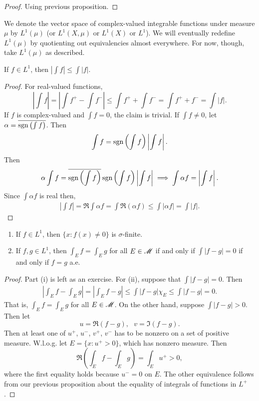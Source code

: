 \documentclass[12pt]{article} %
\begin{document}
\begin{proof}
    Using previous proposition.
\end{proof}

We denote the vector space of complex-valued integrable functions under measure $\mu$ by $L^1(\mu)$ (or $L^1(X, \mu)$ or $L^1(X)$ or $L^1$). We will eventually redefine $L^1(\mu)$ by quotienting out equivalencies almost everywhere. For now, though, take $L^1(\mu)$ as described.

\begin{proposition}
    If $f \in L^1$, then $\left| \int f \right| \leq \int |f|$.
\end{proposition}

\begin{proof}
    For real-valued functions, \[\left|\int f\right| = \left| \int f^+ - \int f^-\right| \leq \int f^+ + \int f^- = \int f^+ + f^- = \int |f|.\] If $f$ is complex-valued and $\int f = 0$, the claim is trivial. If $\int f \neq 0$, let $\alpha = \overline{\operatorname{sgn} \left(\int f\right)}$. Then \[\int f = \operatorname{sgn} \left(\int f \right) \left|\int f\right|.\] Then \[\alpha \int f = \overline{\operatorname{sgn} \left(\int f\right)} \operatorname{sgn} \left(\int f \right) \left|\int f\right| \implies \int \alpha f = \left|\int f\right|.\] Since $\int \alpha f$ is real then, \begin{align*}
        \left|\int f\right| = \Re \int \alpha f = \int \Re(\alpha f) \leq \int |\alpha f| = \int |f|.
    \end{align*}
\end{proof}

\begin{proposition}\label{prop:integrable-functions-equal-ae}
    \begin{enumerate}
        \item If $f \in L^1$, then $\{x : f(x) \neq 0\}$ is $\sigma$-finite.
        \item If $f, g \in L^1$, then $\int_E f = \int_E g$ for all $E \in \mathscr{M}$ if and only if $\int |f - g| = 0$ if and only if $f = g$ a.e.
    \end{enumerate}
\end{proposition}

\begin{proof}
    Part (i) is left as an exercise. For (ii), suppose that $\int |f - g| = 0$. Then \begin{align*}
        \left| \int_E f - \int_E g \right| = \left|\int_E f-g\right| \leq \int |f-g| \chi_E \leq \int |f-g| = 0.
    \end{align*} That is, $\int_E f = \int_E g$ for all $E \in \mathscr{M}$. On the other hand, suppose $\int |f - g| > 0$. Then let \[u = \Re(f-g), \ \ \ v = \Im (f-g).\] Then at least one of $u^+$, $u^-$, $v^+$, $v^-$ has to be nonzero on a set of positive measure. W.l.o.g. let $E = \{x : u^+ > 0\}$, which has nonzero measure. Then \[\Re\left(\int_E f - \int_E g\right) = \int_E u^+ > 0,\] where the first equality holds because $u^- = 0$ on $E$. The other equivalence follows from our previous proposition about the equality of integrals of functions in $L^+$.
\end{proof}
\end{document}
